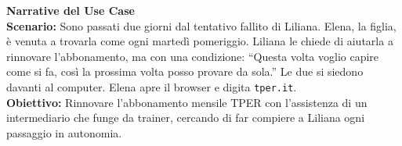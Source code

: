 \documentclass[11pt,a4paper]{article}
\begin{document}
\vspace{0.3cm}

\begin{tcolorbox}[colback=backgroundColor,colframe=borderColor,arc=2mm]
    \textbf{Narrative del Use Case} \\[4pt]
    {\small
    \textbf{Scenario:} Sono passati due giorni dal tentativo fallito di Liliana. Elena, la figlia, è venuta a trovarla come ogni martedì pomeriggio. Liliana le chiede di aiutarla a rinnovare l'abbonamento, ma con una condizione: ``Questa volta voglio capire come si fa, così la prossima volta posso provare da sola.'' Le due si siedono davanti al computer. Elena apre il browser e digita \texttt{tper.it}. \\[4pt]

    \textbf{Obiettivo:} Rinnovare l'abbonamento mensile TPER con l'assistenza di un intermediario che funge da trainer, cercando di far compiere a Liliana ogni passaggio in autonomia. \\[4pt]

}
\end{tcolorbox}
\end{document}
